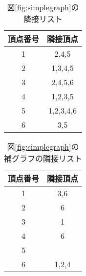 \begin{table}[p]
    \begin{center}
	\caption{図\ref{fig:simplegraph}の隣接リスト}
	\label{tab:nlist}
	\begin{tabular}{|c|c|}
	    \hline 
	    頂点番号& 隣接頂点\\ \hline
	    1 & 2,4,5\\ \hline
	    2 & 1,3,4,5\\ \hline
	    3 & 2,4,5,6\\ \hline
	    4 & 1,2,3,5\\ \hline
	    5 & 1,2,3,4,6\\ \hline
	    6 & 3,5 \\ \hline
	\end{tabular}
    \end{center}
\end{table}

\begin{table}[p]
    \begin{center}
	\caption{図\ref{fig:simplegraph}の補グラフの隣接リスト}
	\label{tab:nlist2}
	\begin{tabular}{|c|c|}
	    \hline 
	    頂点番号& 隣接頂点\\ \hline
	    1 & 3,6\\ \hline
	    2 & 6\\ \hline
	    3 & 1\\ \hline
	    4 & 6\\ \hline
	    5 & \\ \hline
	    6 & 1,2,4 \\ \hline
	\end{tabular}
    \end{center}
\end{table}












